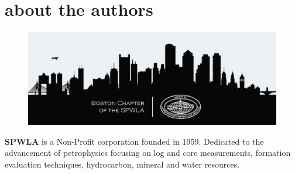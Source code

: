 \documentclass[10pt,twocolumn,twoside]{article}
\begin{document}


\section{about the authors}
\begin{figure}
	\includegraphics[width=1.0\linewidth]{boston_chapter_logo.png}
\end{figure}
\textbf{SPWLA} is a Non-Profit corporation founded in 1959. Dedicated to the advancement of petrophysics focusing on log and core measurements, formation evaluation techniques,
hydrocarbon, mineral and water resources.
\end{document}
